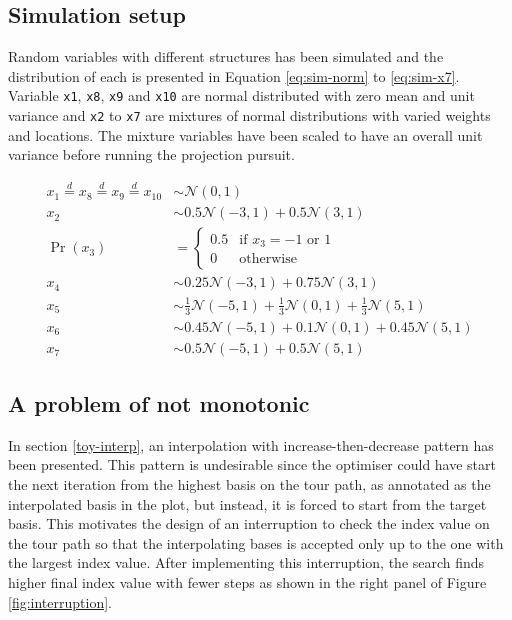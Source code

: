 \documentclass[12pt]{article}
\begin{document}
\hypertarget{simulation-setup}{%
\subsection{Simulation setup}\label{simulation-setup}}

Random variables with different structures has been simulated and the distribution of each is presented in Equation \ref{eq:sim-norm} to \ref{eq:sim-x7}. Variable \texttt{x1}, \texttt{x8}, \texttt{x9} and \texttt{x10} are normal distributed with zero mean and unit variance and \texttt{x2} to \texttt{x7} are mixtures of normal distributions with varied weights and locations. The mixture variables have been scaled to have an overall unit variance before running the projection pursuit.

\begin{align}
x_1 \overset{d}{=} x_8 \overset{d}{=} x_9 \overset{d}{=} x_{10}& \sim \mathcal{N}(0, 1) \label{eq:sim-norm} \\
x_2 &\sim 0.5 \mathcal{N}(-3, 1) + 0.5 \mathcal{N}(3, 1)\label{eq:sim-x2}\\
\Pr(x_3) &= 
\begin{cases}
0.5 & \text{if $x_3 = -1$ or $1$}\\
0 & \text{otherwise}
\end{cases}\label{eq:sim-x3}\\
x_4 &\sim 0.25 \mathcal{N}(-3, 1) + 0.75 \mathcal{N}(3, 1) \label{eq:sim-x4}\\
x_5 &\sim \frac{1}{3} \mathcal{N}(-5, 1) + \frac{1}{3} \mathcal{N}(0, 1) + \frac{1}{3} \mathcal{N}(5, 1)\label{eq:sim-x5}\\
x_6 &\sim 0.45 \mathcal{N}(-5, 1) + 0.1 \mathcal{N}(0, 1) + 0.45 \mathcal{N}(5, 1)\label{eq:sim-x6}\\
x_7 &\sim 0.5 \mathcal{N}(-5, 1) + 0.5 \mathcal{N}(5, 1) 
\label{eq:sim-x7}
\end{align}

\hypertarget{monotonic}{%
\subsection{A problem of not monotonic}\label{monotonic}}

In section \ref{toy-interp}, an interpolation with increase-then-decrease pattern has been presented. This pattern is undesirable since the optimiser could have start the next iteration from the highest basis on the tour path, as annotated as the interpolated basis in the plot, but instead, it is forced to start from the target basis. This motivates the design of an interruption to check the index value on the tour path so that the interpolating bases is accepted only up to the one with the largest index value. After implementing this interruption, the search finds higher final index value with fewer steps as shown in the right panel of Figure \ref{fig:interruption}.
\end{document}
